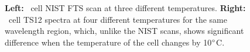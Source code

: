 \begin{figure}
\centering
{}
\caption{{\bf Left:} \het\ cell NIST FTS scan at three different
temperatures. {\bf Right:} \het\ cell TS12 spectra at four different
temperatures for the same wavelength region, which, unlike the NIST
scans, shows significant difference when the temperature of the cell
changes by 10$^{\circ}$C.
\label{het:fig:tempchange}}
\end{figure}



